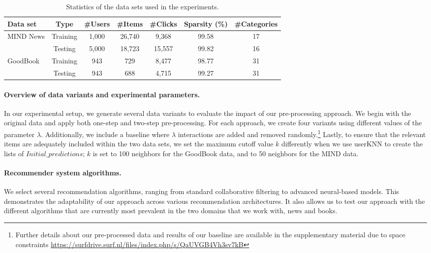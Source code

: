 \documentclass[runningheads]{llncs}
\begin{document}
\begin{table}[htb]
\centering
\caption{Statistics of the data sets used in the experiments.}
\label{tab:datasets}
\scriptsize{
\begin{tabular}{lcccccc}
\toprule
\textbf{Data set}     & \textbf{Type}   & \textbf{\#Users} & \textbf{\#Items} & \textbf{\#Clicks} & \textbf{Sparsity (\%)} & \textbf{\#Categories} \\ \midrule
\multirow{2}{*}{MIND News}   & Training & 1,000  & 26,740 & 9,368  & 99.58  & 17 \\
                             & Testing  & 5,000  & 18,723 & 15,557 & 99.82  & 16 \\ 
\multirow{2}{*}{GoodBook}    & Training & 943    & 729    & 8,477  & 98.77  & 31 \\
                             & Testing  & 943    & 688    & 4,715  & 99.27  & 31 \\ 
\bottomrule
\end{tabular}}
\end{table}


\paragraph{Overview of data variants and experimental parameters.} 
In our experimental setup, we generate several data variants to evaluate the impact of our pre-processing approach. We begin with the original data and apply both one-step and two-step pre-processing. For each approach, we create four variants using different values of the parameter $\lambda $. 
Additionally, we include a baseline where $\lambda$ interactions are added and removed randomly.\footnote{Further details about our pre-processed data and results of our baseline are available in the supplementary material due to space constraints \url{https://surfdrive.surf.nl/files/index.php/s/QaUVGB4Vh3sv7kB}}
Lastly, to ensure that the relevant items are adequately included within the two data sets, we set the maximum cutoff value $k$ differently when we use userKNN to create the lists of \(Initial\_predictions\); $k$ is set to 100 neighbors for the GoodBook data, and to 50 neighbors for the MIND data.  



\paragraph{Recommender system algorithms.}
\label{sub:recsysAlgo}
We select several recommendation algorithms, ranging from standard collaborative filtering to advanced neural-based models. 
This demonstrates the adaptability of our approach across various recommendation architectures.
It also allows us to test our approach with the different algorithms that are currently most prevalent in the two domains that we work with, news and books.  
\end{document}
